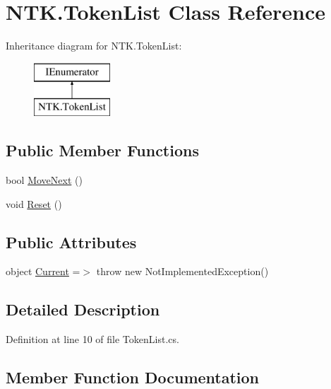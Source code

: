 \hypertarget{class_n_t_k_1_1_token_list}{}\section{N\+T\+K.\+Token\+List Class Reference}
\label{class_n_t_k_1_1_token_list}
Inheritance diagram for N\+T\+K.\+Token\+List\+:\begin{figure}[H]
\begin{center}
\leavevmode
\includegraphics[height=2.000000cm]{d2/d4c/class_n_t_k_1_1_token_list}
\end{center}
\end{figure}
\subsection*{Public Member Functions}
\begin{DoxyCompactItemize}
\item 
bool \mbox{\hyperlink{class_n_t_k_1_1_token_list_a70a02a8586055f624f712a66b0fe02f4}{Move\+Next}} ()
\item 
void \mbox{\hyperlink{class_n_t_k_1_1_token_list_a7e3b0bdac1893b2150aadf922adee889}{Reset}} ()
\end{DoxyCompactItemize}
\subsection*{Public Attributes}
\begin{DoxyCompactItemize}
\item 
object \mbox{\hyperlink{class_n_t_k_1_1_token_list_a90d2a8e7bd79c08bb1aa98617175b86d}{Current}} =$>$ throw new Not\+Implemented\+Exception()
\end{DoxyCompactItemize}


\subsection{Detailed Description}


Definition at line 10 of file Token\+List.\+cs.



\subsection{Member Function Documentation}
\mbox{\label{class_n_t_k_1_1_token_list_a70a02a8586055f624f712a66b0fe02f4}} 
